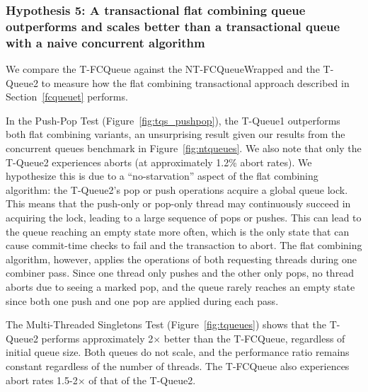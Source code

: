 \vspace{12pt}
\noindent{}

\subsubsection{Hypothesis 5: A transactional flat combining queue outperforms and scales better than a transactional queue with a naive concurrent algorithm}

We compare the T-FCQueue against the NT-FCQueueWrapped and the T-Queue2 to measure how the flat combining transactional approach described in Section~\ref{fcqueuet} performs.

In the Push-Pop Test (Figure~\ref{fig:tqs_pushpop}), the T-Queue1 outperforms both flat combining variants, an unsurprising result given our results from the concurrent queues benchmark in Figure~\ref{fig:ntqueues}. We also note that only the T-Queue2 experiences aborts (at approximately 1.2\% abort rates). We hypothesize this is due to a ``no-starvation'' aspect of the flat combining algorithm: the T-Queue2's pop or push operations acquire a global queue lock. This means that the push-only or pop-only thread may continuously succeed in acquiring the lock, leading to a large sequence of pops or pushes. This can lead to the queue reaching an empty state more often, which is the only state that can cause commit-time checks to fail and the transaction to abort. The flat combining algorithm, however, applies the operations of both requesting threads during one combiner pass. Since one thread only pushes and the other only pops, no thread aborts due to seeing a marked pop, and the queue rarely reaches an empty state since both one push and one pop are applied during each pass.

The Multi-Threaded Singletons Test (Figure~\ref{fig:tqueues}) shows that the T-Queue2 performs approximately 2$\times$ better than the T-FCQueue, regardless of initial queue size. Both queues do not scale, and the performance ratio remains constant regardless of the number of threads. The T-FCQueue also experiences abort rates 1.5-2$\times$ of that of the T-Queue2.

\vspace{12pt}
\noindent{}

